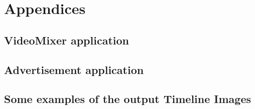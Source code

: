 \appendix
\chapter*{Appendices}\label{chap:Appendices}
\setcounter{chapter}{6}  %
\setcounter{equation}{0} 

\section{VideoMixer application}


\clearpage\section{Advertisement application}


\clearpage\section{Some examples of the output Timeline Images}\label{app:TIs}


